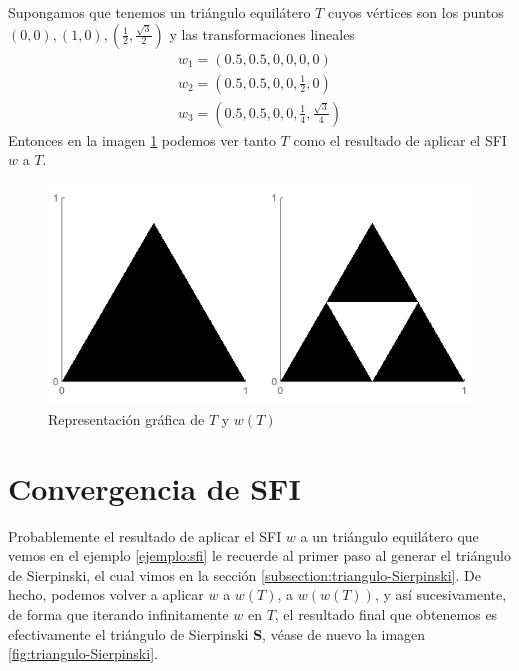 \begin{ejemplo}
    \label{ejemplo:sfi}
    Supongamos que tenemos un triángulo equilátero $T$ cuyos vértices son los puntos $(0,0),(1,0),(\frac{1}{2},\frac{\sqrt{3}}{2})$ y las transformaciones lineales
    \begin{eqnarray*}
        w_1 = \left(0.5,0.5,0,0,0,0\right) \\
        w_2 = \left(0.5,0.5,0,0,\frac 1 2,0\right) \\
        w_3 = \left(0.5,0.5,0,0,\frac 1 4,\frac{\sqrt{3}}{4}\right)
    \end{eqnarray*}
    Entonces en la imagen \ref{fig:ejemplo-sfi} podemos ver tanto $T$ como el resultado de aplicar el SFI $w$ a $T$.
    \begin{figure} [ht]
    \centering
    \includegraphics[scale = 0.6]{img/C4/ejemplo-sfi.png}
    \caption{Representación gráfica de $T$ y $w(T)$}
        \label{fig:ejemplo-sfi}
    \end{figure}
\end{ejemplo}

\section{Convergencia de SFI}
\label{section:convergencia-sfi}

Probablemente el resultado de aplicar el SFI $w$ a un triángulo equilátero que vemos en el ejemplo \ref{ejemplo:sfi} le recuerde al primer paso al generar el triángulo de Sierpinski, el cual vimos en la sección \ref{subsection:triangulo-Sierpinski}. De hecho, podemos volver a aplicar $w$ a $w(T)$, a $w(w(T))$, y así sucesivamente, de forma que iterando infinitamente $w$ en $T$, el resultado final que obtenemos es efectivamente el triángulo de Sierpinski \textbf{S}, véase de nuevo la imagen \ref{fig:triangulo-Sierpinski}.

